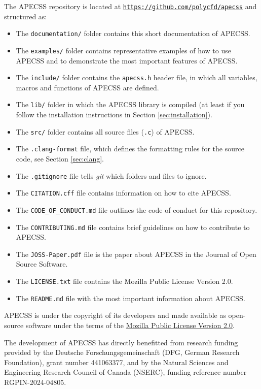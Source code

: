 The APECSS repository is located at \href{https://github.com/polycfd/apecss}{\texttt{https://github.com/polycfd/apecss}} and structured as:\vspace{-1em}
\begin{itemize}[noitemsep]
    \item The {\tt documentation/} folder contains this short documentation of APECSS.
    \item The {\tt examples/} folder contains representative examples of how to use APECSS and to demonstrate the most important features of APECSS. 
    \item The {\tt include/} folder contains the {\tt apecss.h} header file, in which all variables, macros and functions of APECSS are defined.
    \item The {\tt lib/} folder in which the APECSS library is compiled (at least if you follow the installation instructions in Section \ref{sec:installation}).
    \item The {\tt src/} folder contains all source files ({\tt *.c}) of APECSS.
    \item The {\tt .clang-format} file, which defines the formatting rules for the source code, see Section \ref{sec:clang}.
    \item The {\tt .gitignore} file tells \textit{git} which folders and files to ignore.
    \item The {\tt CITATION.cff} file contains information on how to cite APECSS.
    \item The {\tt CODE\_OF\_CONDUCT.md} file outlines the code of conduct for this repository.
    \item The {\tt CONTRIBUTING.md} file contains brief guidelines on how to contribute to APECSS.
    \item The {\tt JOSS-Paper.pdf} file is the paper about APECSS in the Journal of Open Source Software.
    \item The {\tt LICENSE.txt} file contains the Mozilla Public License Version 2.0.
    \item The {\tt README.md} file with the most important information about APECSS.
\end{itemize}

APECSS is under the copyright of its developers and made available as open-source software under the terms of the \href{https://www.mozilla.org/en-US/MPL/2.0/}{Mozilla Public License Version 2.0}.

The development of APECSS has directly benefitted from research funding provided by the Deutsche Forschungsgemeinschaft (DFG, German Research Foundation), grant number 441063377, and by the Natural Sciences and Engineering Research Council of Canada (NSERC), funding reference number RGPIN-2024-04805.
